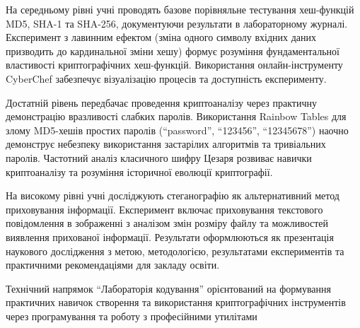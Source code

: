 На середньому рівні учні проводять базове порівняльне тестування хеш-функцій MD5, SHA-1 та SHA-256, документуючи результати в лабораторному журналі. Експеримент з лавинним ефектом (зміна одного символу вхідних даних призводить до кардинальної зміни хешу) формує розуміння фундаментальної властивості криптографічних хеш-функцій. Використання онлайн-інструменту CyberChef забезпечує візуалізацію процесів та доступність експерименту.

Достатній рівень передбачає проведення криптоаналізу через практичну демонстрацію вразливості слабких паролів. Використання Rainbow Tables для злому MD5-хешів простих паролів (``password'', ``123456'', ``12345678'') наочно демонструє небезпеку використання застарілих алгоритмів та тривіальних паролів. Частотний аналіз класичного шифру Цезаря розвиває навички криптоаналізу та розуміння історичної еволюції криптографії.

На високому рівні учні досліджують стеганографію як альтернативний метод приховування інформації. Експеримент включає приховування текстового повідомлення в зображенні з аналізом змін розміру файлу та можливостей виявлення прихованої інформації. Результати оформлюються як презентація наукового дослідження з метою, методологією, результатами експериментів та практичними рекомендаціями для закладу освіти.



Технічний напрямок ``Лабораторія кодування'' орієнтований на формування практичних навичок створення та використання криптографічних інструментів через програмування та роботу з професійними утилітами 



